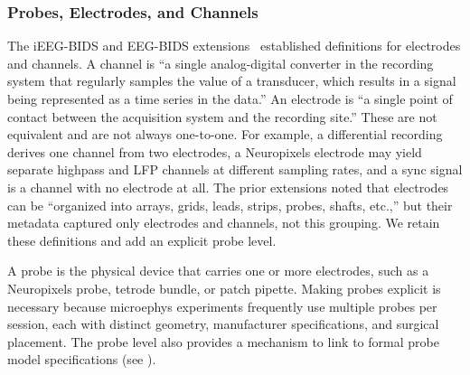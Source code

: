 \documentclass[fleqn,10pt]{article}
\begin{document}


\subsubsection*{Probes, Electrodes, and Channels}\label{sec:probes-electrodes-channels}

The iEEG-BIDS and EEG-BIDS extensions~\citep{pernet_eeg-bids_2019, holdgraf_ieeg-bids_2019} established definitions for electrodes and channels.
A channel is ``a single analog-digital converter in the recording system that regularly samples the value of a transducer, which results in a signal being represented as a time series in the data.''
An electrode is ``a single point of contact between the acquisition system and the recording site.''
These are not equivalent and are not always one-to-one. For example, a differential recording derives one channel from two electrodes, a Neuropixels electrode may yield separate highpass and LFP channels at different sampling rates, and a sync signal is a channel with no electrode at all.
The prior extensions noted that electrodes can be ``organized into arrays, grids, leads, strips, probes, shafts, etc.,'' but their metadata captured only electrodes and channels, not this grouping.
We retain these definitions and add an explicit probe level.

A probe is the physical device that carries one or more electrodes, such as a Neuropixels probe, tetrode bundle, or patch pipette.
Making probes explicit is necessary because microephys experiments frequently use multiple probes per session, each with distinct geometry, manufacturer specifications, and surgical placement.
The probe level also provides a mechanism to link to formal probe model specifications (see ).
\end{document}
